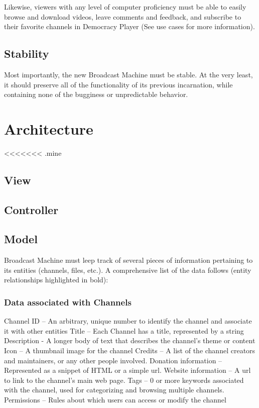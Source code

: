 \documentclass[a4paper,12pt]{report}
\begin{document}
Likewise, viewers with any level of computer proficiency must be able to easily browse and download videos, leave comments and feedback, and subscribe to their favorite channels in Democracy Player (See use cases for more information).

\section{Stability}

	Most importantly, the new Broadcast Machine must be stable. At the very least, it should preserve all of the functionality of its previous incarnation, while containing none of the bugginess or unpredictable behavior. 

\chapter{Architecture}

<<<<<<< .mine
\section{View}

\section{Controller}

\section{Model}
Broadcast Machine must leep track of  several pieces of information pertaining to its entities (channels, files, etc.). A comprehensive list of the data follows (entity relationships highlighted in bold):

\subsection{Data associated with Channels}
Channel ID – An arbitrary, unique number to identify the channel and associate it 		with other entities
Title – Each Channel has a title, represented by a string
Description - A longer body of text that describes the channel's theme or content
Icon – A thumbnail image for the channel
Credits – A list of the channel creators and maintainers, or any other people 	involved. 
Donation information – Represented as a snippet of HTML or a simple url.
Website information – A url to link to the channel's main web page.
Tags – 0 or more keywords associated with the channel, used for categorizing and 	browsing multiple channels.
Permissions – Rules about which users can access or modify the channel
\end{document}
